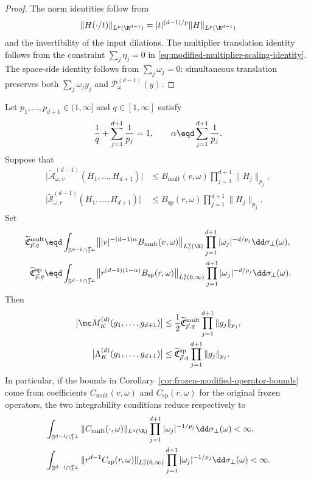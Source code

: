 \begin{proof}
The norm identities follow from
\[
  \|H(\cdot/t)\|_{L^p(\R^{d-1})}
  =|t|^{(d-1)/p}\|H\|_{L^p(\R^{d-1})}
\]
and the invertibility of the input dilations.  The multiplier translation
identity follows from the constraint \(\sum_j\eta_j=0\) in
\eqref{eq:modified-multiplier-scaling-identity}.  The space-side identity
follows from \(\sum_j\omega_j=0\): simultaneous translation preserves both
\(\sum_j\omega_jy_j\) and \(\mathcal P_\omega^{(d-1)}(y)\).
\end{proof}

\begin{corollary}
\label{cor:modified-operator-integrability}
Let \(p_1,\ldots,p_{d+1}\in(1,\infty]\) and \(q\in[1,\infty]\) satisfy
\[
  \frac1q+\sum_{j=1}^{d+1}\frac1{p_j}=1,
  \qquad
  \alpha\eqd\sum_{j=1}^{d+1}\frac1{p_j}.
\]
Suppose that
\[
\begin{aligned}
  \bigl|\widetilde{\mathcal A}_{\omega,v}^{(d-1)}(H_1,\ldots,H_{d+1})\bigr|
  &\le B_{\mathrm{mult}}(v,\omega)\prod_{j=1}^{d+1}\|H_j\|_{p_j},\\
  \bigl|\widetilde{\mathcal S}_{\omega,r}^{(d-1)}(H_1,\ldots,H_{d+1})\bigr|
  &\le B_{\mathrm{sp}}(r,\omega)\prod_{j=1}^{d+1}\|H_j\|_{p_j}.
\end{aligned}
\]
Set
\[
\begin{aligned}
  \widetilde{\mathfrak C}_{\vec p,q}^{\mathrm{mult}}
  &\eqd
  \int_{\mathbb S^{d-1}\cap\vec1^\perp}
  \bigl\||v|^{-(d-1)\alpha}B_{\mathrm{mult}}(v,\omega)
  \bigr\|_{L^q_v(\R)}
  \prod_{j=1}^{d+1}|\omega_j|^{-d/p_j}
  \dd\sigma_\perp(\omega),\\
  \widetilde{\mathfrak C}_{\vec p,q}^{\mathrm{sp}}
  &\eqd
  \int_{\mathbb S^{d-1}\cap\vec1^\perp}
  \bigl\|r^{(d-1)(1-\alpha)}B_{\mathrm{sp}}(r,\omega)
  \bigr\|_{L^q_r(0,\infty)}
  \prod_{j=1}^{d+1}|\omega_j|^{-d/p_j}
  \dd\sigma_\perp(\omega).
\end{aligned}
\]
Then
\[
\begin{aligned}
  \bigl|\mc M_K^{(d)}(g_1,\ldots,g_{d+1})\bigr|
  &\le \frac12\widetilde{\mathfrak C}_{\vec p,q}^{\mathrm{mult}}
  \prod_{j=1}^{d+1}\|g_j\|_{p_j},\\
  \bigl|\Lambda_K^{(d)}(g_1,\ldots,g_{d+1})\bigr|
  &\le \widetilde{\mathfrak C}_{\vec p,q}^{\mathrm{sp}}
  \prod_{j=1}^{d+1}\|g_j\|_{p_j}.
\end{aligned}
\]
In particular, if the bounds in Corollary~\ref{cor:frozen-modified-operator-bounds}
come from coefficients \(C_{\mathrm{mult}}(v,\omega)\) and
\(C_{\mathrm{sp}}(r,\omega)\) for the original frozen operators, the two
integrability conditions reduce respectively to
\[
\begin{aligned}
  &\int_{\mathbb S^{d-1}\cap\vec1^\perp}
  \|C_{\mathrm{mult}}(\cdot,\omega)\|_{L^q(\R)}
  \prod_{j=1}^{d+1}|\omega_j|^{-1/p_j}\dd\sigma_\perp(\omega)<\infty,\\
  &\int_{\mathbb S^{d-1}\cap\vec1^\perp}
  \|r^{d-1}C_{\mathrm{sp}}(r,\omega)\|_{L^q_r(0,\infty)}
  \prod_{j=1}^{d+1}|\omega_j|^{-1/p_j}\dd\sigma_\perp(\omega)<\infty.
\end{aligned}
\]
\end{corollary}

